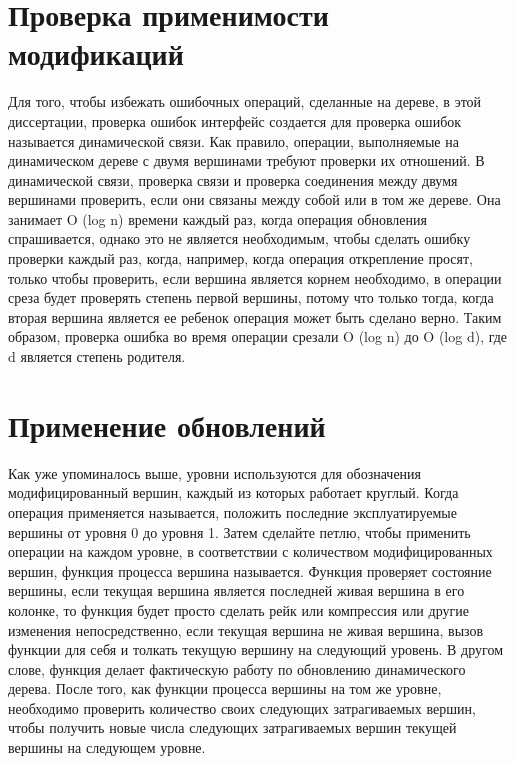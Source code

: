 \documentclass[specification,annotation,times]{itmo-student-thesis}
\newcommand{\revise}[1]{{\color{red!70!black} #1 }}
\begin{document}
\section{Проверка применимости модификаций}

\revise{
Для того, чтобы избежать ошибочных операций, сделанные на дереве, в этой диссертации, проверка ошибок интерфейс создается для проверка ошибок называется динамической связи. Как правило, операции, 
выполняемые на динамическом дереве с двумя вершинами требуют проверки их отношений. В динамической связи, проверка связи и проверка соединения между двумя вершинами проверить, если они связаны между собой 
или в том же дереве. Она занимает O (log n) времени каждый раз, когда операция обновления спрашивается, однако это не является необходимым, чтобы сделать ошибку проверки каждый раз, когда, например, когда 
операция открепление просят, только чтобы проверить, если вершина является корнем необходимо, в операции среза будет проверять степень первой вершины, потому что только тогда, когда вторая вершина 
является ее ребенок операция может быть сделано верно. Таким образом, проверка ошибка во время операции срезали O (log n) до O (log d), где d является степень родителя.
}

\section{Применение обновлений}

\revise{
Как уже упоминалось выше, уровни используются для обозначения модифицированный вершин, каждый из которых работает круглый. Когда операция применяется называется, положить последние эксплуатируемые вершины 
от уровня 0 до уровня 1. Затем сделайте петлю, чтобы применить операции на каждом уровне, в соответствии с количеством модифицированных вершин, функция процесса вершина называется. Функция проверяет 
состояние вершины, если текущая вершина является последней живая вершина в его колонке, то функция будет просто сделать рейк или компрессия или другие изменения непосредственно, если текущая вершина не 
живая вершина, вызов функции для себя и толкать текущую вершину на следующий уровень. В другом слове, функция делает фактическую работу по обновлению динамического дерева. После того, как функции процесса 
вершины на том же уровне, необходимо проверить количество своих следующих затрагиваемых вершин, чтобы получить новые числа следующих затрагиваемых вершин текущей вершины на следующем уровне.
}
\end{document}
